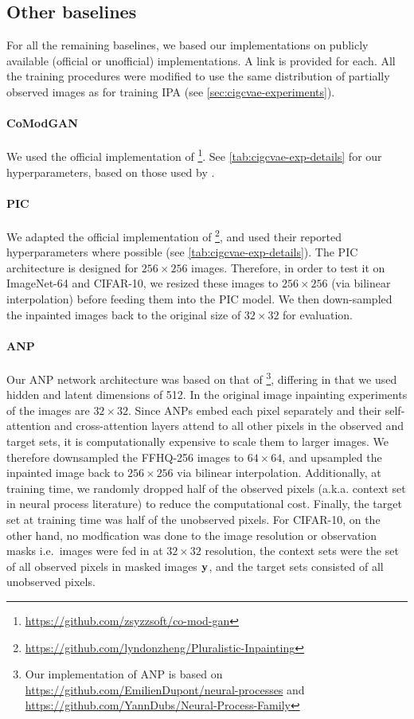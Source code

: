 \subsection{Other baselines}
For all the remaining baselines, we based our implementations on publicly
available (official or unofficial) implementations. A link is provided for each.
All the training procedures were modified to use the same distribution of
partially observed images as for training IPA (see \cref{sec:cigcvae-experiments}).

\paragraph{CoModGAN} We used the official implementation of
\citet{zhao2021large}\footnote{\url{https://github.com/zsyzzsoft/co-mod-gan}}.
See \cref{tab:cigcvae-exp-details} for our hyperparameters, based on those used by
\citet{zhao2021large}.

\paragraph{PIC} We adapted the official implementation of
\citet{zheng2019pluralistic}\footnote{\url{https://github.com/lyndonzheng/Pluralistic-Inpainting}},
and used their reported hyperparameters where possible (see
\cref{tab:cigcvae-exp-details}). The PIC architecture is designed for $256 \times 256$
images. Therefore, in order to test it on ImageNet-64 and CIFAR-10, we resized
these images to $256 \times 256$ (via bilinear interpolation) before feeding
them into the PIC model. We then down-sampled the inpainted images back to the
original size of $32 \times 32$ for evaluation.

\paragraph{ANP} Our ANP network architecture was based on that of
\citet{kim2019attentive}\footnote{Our implementation of ANP is based on
  \url{https://github.com/EmilienDupont/neural-processes} and
  \url{https://github.com/YannDubs/Neural-Process-Family}}, differing in that we
used hidden and latent dimensions of 512. In the original image inpainting
experiments of \citep{kim2019attentive} the images are $32 \times 32$. Since
ANPs embed each pixel separately and their self-attention and cross-attention
layers attend to all other pixels in the observed and target sets, it is
computationally expensive to scale them to larger images. We therefore
downsampled the FFHQ-256 images to $64 \times 64$, and upsampled the inpainted
image back to $256 \times 256$ via bilinear interpolation. Additionally, at
training time, we randomly dropped half of the observed pixels (a.k.a. context
set in neural process literature) to reduce the computational cost. Finally, the
target set at training time was half of the unobserved pixels. For CIFAR-10, on
the other hand, no modfication was done to the image resolution or observation
masks i.e.~images were fed in at $32 \times 32$ resolution, the context sets
were the set of all observed pixels in masked images ${\mathbf{y}}$, and the target
sets consisted of all unobserved pixels.

